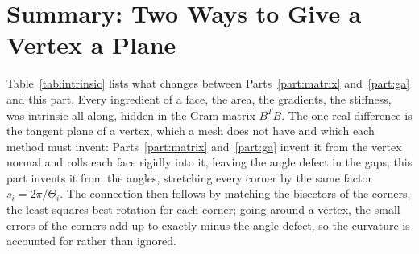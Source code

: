 \section{Summary: Two Ways to Give a Vertex a Plane}
\label{section:int_summary}

Table~\ref{tab:intrinsic} lists what changes between Parts~\ref{part:matrix} and~\ref{part:ga} and this part. Every ingredient of a face, the area, the gradients, the stiffness, was intrinsic all along, hidden in the Gram matrix $B^T B$. The one real difference is the tangent plane of a vertex, which a mesh does not have and which each method must invent: Parts~\ref{part:matrix} and~\ref{part:ga} invent it from the vertex normal and rolls each face rigidly into it, leaving the angle defect in the gaps; this part invents it from the angles, stretching every corner by the same factor $s_i = 2\pi/\Theta_i$. The connection then follows by matching the bisectors of the corners, the least-squares best rotation for each corner; going around a vertex, the small errors of the corners add up to exactly minus the angle defect, so the curvature is accounted for rather than ignored.

